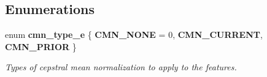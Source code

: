\subsection*{Enumerations}
\begin{DoxyCompactItemize}
\item 
enum {\bf cmn\+\_\+type\+\_\+e} \{ {\bfseries C\+M\+N\+\_\+\+N\+O\+N\+E} = 0, 
{\bfseries C\+M\+N\+\_\+\+C\+U\+R\+R\+E\+N\+T}, 
{\bfseries C\+M\+N\+\_\+\+P\+R\+I\+O\+R}
 \}\label{cmn_8h_a5bb134416e9e63a317eac20b0102bd59}

\begin{DoxyCompactList}\small\item\em Types of cepstral mean normalization to apply to the features. \end{DoxyCompactList}\end{DoxyCompactItemize}
